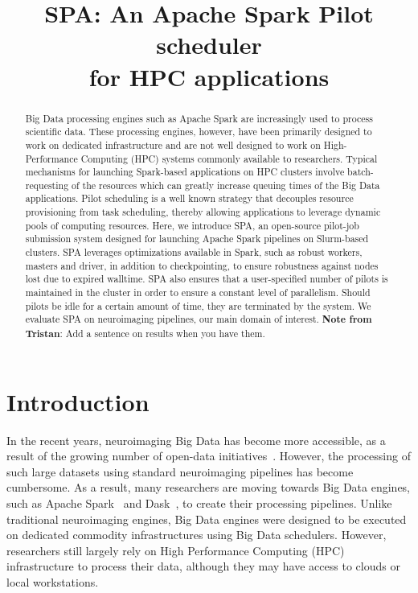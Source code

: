 \documentclass{IEEEtran}
\newcommand{\tristan}[1]{\color{red}\textbf{Note from Tristan}:
      #1 \color{black}}
\begin{document}
\title{SPA: An Apache Spark Pilot scheduler\\ for HPC applications}
\author{
    \IEEEauthorblockA{}
}
\maketitle

\begin{abstract}
    Big Data processing engines such as Apache Spark are increasingly 
    used to process scientific data. These processing engines, however, 
    have been primarily designed to work on dedicated infrastructure 
    and are not well designed to work on High-Performance Computing 
    (HPC) systems commonly available to researchers. Typical mechanisms 
    for launching Spark-based applications on HPC clusters involve 
    batch-requesting of the resources which can greatly increase 
    queuing times of the Big Data applications. Pilot scheduling is a 
    well known strategy that decouples resource provisioning from task 
    scheduling, thereby allowing applications to leverage dynamic 
    pools of computing resources. Here, we introduce SPA, an 
    open-source
    pilot-job submission system designed for launching Apache Spark pipelines 
    on Slurm-based clusters. SPA leverages optimizations available in Spark, 
    such as robust workers, masters and driver, in addition to 
    checkpointing, to ensure robustness against nodes lost due to
    expired walltime. SPA also ensures that a 
    user-specified number of pilots is maintained in the cluster in 
    order to ensure a constant level of parallelism. Should pilots be 
    idle for a certain amount of time, they are terminated by 
    the system. We evaluate SPA on neuroimaging pipelines, our main domain of interest. \tristan{Add a sentence on results when you have them.}

\end{abstract}

\section{Introduction}

In the recent years, neuroimaging Big Data has become more accessible, as a
result of the growing number of open-data initiatives~\cite{openneuro, hcp, ukbiobank}. However, the
processing of such large datasets using standard neuroimaging pipelines has 
become cumbersome. As a result, many researchers are moving towards Big Data 
engines, such as Apache Spark~\cite{spark} and Dask~\cite{sdask}, to 
create their processing pipelines. Unlike traditional neuroimaging 
engines, Big Data engines were designed to be executed on dedicated 
commodity infrastructures using Big Data schedulers. However, 
researchers still largely rely on High Performance Computing (HPC) 
infrastructure to process their data, although they may have access to 
clouds or local workstations.
\end{document}
